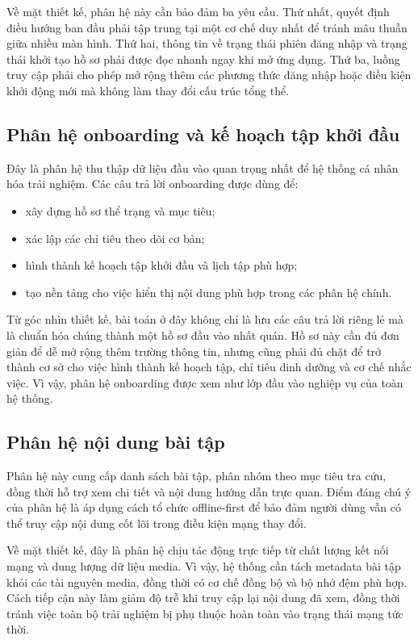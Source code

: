 Về mặt thiết kế, phân hệ này cần bảo đảm ba yêu cầu. Thứ nhất, quyết định điều hướng ban đầu phải tập trung tại một cơ chế duy nhất để tránh mâu thuẫn giữa nhiều màn hình. Thứ hai, thông tin về trạng thái phiên đăng nhập và trạng thái khởi tạo hồ sơ phải được đọc nhanh ngay khi mở ứng dụng. Thứ ba, luồng truy cập phải cho phép mở rộng thêm các phương thức đăng nhập hoặc điều kiện khởi động mới mà không làm thay đổi cấu trúc tổng thể.

\subsection{Phân hệ onboarding và kế hoạch tập khởi đầu}

Đây là phân hệ thu thập dữ liệu đầu vào quan trọng nhất để hệ thống cá nhân hóa trải nghiệm. Các câu trả lời onboarding được dùng để:

\begin{itemize}
    \item xây dựng hồ sơ thể trạng và mục tiêu;
    \item xác lập các chỉ tiêu theo dõi cơ bản;
    \item hình thành kế hoạch tập khởi đầu và lịch tập phù hợp;
    \item tạo nền tảng cho việc hiển thị nội dung phù hợp trong các phân hệ chính.
\end{itemize}

Từ góc nhìn thiết kế, bài toán ở đây không chỉ là lưu các câu trả lời riêng lẻ mà là chuẩn hóa chúng thành một hồ sơ đầu vào nhất quán. Hồ sơ này cần đủ đơn giản để dễ mở rộng thêm trường thông tin, nhưng cũng phải đủ chặt để trở thành cơ sở cho việc hình thành kế hoạch tập, chỉ tiêu dinh dưỡng và cơ chế nhắc việc. Vì vậy, phân hệ onboarding được xem như lớp đầu vào nghiệp vụ của toàn hệ thống.

\subsection{Phân hệ nội dung bài tập}

Phân hệ này cung cấp danh sách bài tập, phân nhóm theo mục tiêu tra cứu, đồng thời hỗ trợ xem chi tiết và nội dung hướng dẫn trực quan. Điểm đáng chú ý của phân hệ là áp dụng cách tổ chức offline-first để bảo đảm người dùng vẫn có thể truy cập nội dung cốt lõi trong điều kiện mạng thay đổi.

Về mặt thiết kế, đây là phân hệ chịu tác động trực tiếp từ chất lượng kết nối mạng và dung lượng dữ liệu media. Vì vậy, hệ thống cần tách metadata bài tập khỏi các tài nguyên media, đồng thời có cơ chế đồng bộ và bộ nhớ đệm phù hợp. Cách tiếp cận này làm giảm độ trễ khi truy cập lại nội dung đã xem, đồng thời tránh việc toàn bộ trải nghiệm bị phụ thuộc hoàn toàn vào trạng thái mạng tức thời.


